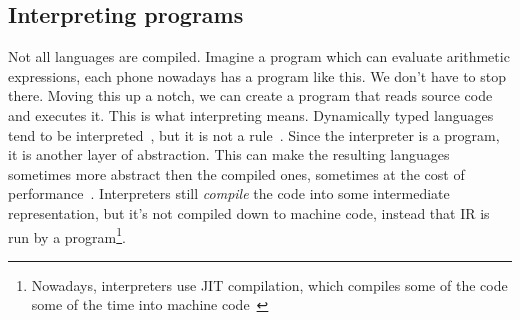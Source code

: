 \subsection{Interpreting programs}
Not all languages are compiled. Imagine a program which can evaluate arithmetic
expressions, each phone nowadays has a program like this. We don't have to stop
there. Moving this up a notch, we can create a program that reads source code
and executes it. This is what interpreting means. Dynamically typed languages
tend to be interpreted~\cite{python, lua, javascript}, but it is not a rule~\cite{scala}. Since
the interpreter is a program, it is another layer of abstraction. This can make
the resulting languages sometimes more abstract then the compiled ones,
sometimes at the cost of performance~\cite{jit}. Interpreters still
\textit{compile} the code into some intermediate representation, but it's not
compiled down to machine code, instead that IR is run by a
program\footnote{Nowadays, interpreters use JIT compilation, which compiles
some of the code some of the time into machine code~\cite{jit}}.
